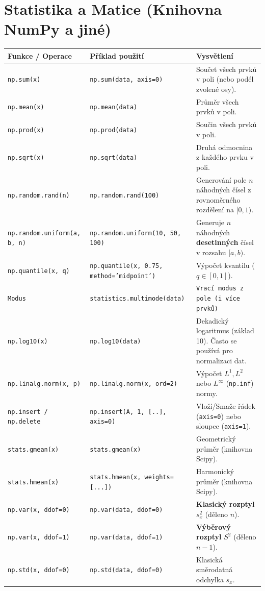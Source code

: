 \documentclass[a4paper, 11pt]{article}
\newenvironment{funkcedict}
{
\renewcommand{\arraystretch}{1.4}
\begin{tabular}{p{0.30\textwidth} p{0.32\textwidth} p{0.33\textwidth}}
\toprule
\textbf{Funkce / Operace} & \textbf{Příklad použití} & \textbf{Vysvětlení} \\
\midrule
}
{
\bottomrule
\end{tabular}
}
\begin{document}
\section{Statistika a Matice (Knihovna NumPy a jiné)}
\begin{funkcedict}
\texttt{np.sum(x)} & \texttt{np.sum(data, axis=0)} & Součet všech prvků v poli (nebo podél zvolené osy). \\
\texttt{np.mean(x)} & \texttt{np.mean(data)} & Průměr všech prvků v poli. \\
\texttt{np.prod(x)} & \texttt{np.prod(data)} & Součin všech prvků v poli. \\
\texttt{np.sqrt(x)} & \texttt{np.sqrt(data)} & Druhá odmocnina z každého prvku v poli. \\
\texttt{np.random.rand(n)} & \texttt{np.random.rand(100)} & Generování pole $n$ náhodných čísel z rovnoměrného rozdělení na $[0, 1)$. \\
\texttt{np.random.uniform(a, b, n)} & \texttt{np.random.uniform(10, 50, 100)} & Generuje $n$ náhodných \textbf{desetinných} čísel v rozsahu $[a, b)$. \\
\texttt{np.quantile(x, q)} & \texttt{np.quantile(x, 0.75, method='midpoint')} & Výpočet kvantilu ($q \in [0, 1]$). \\
\texttt{Modus} & \texttt{statistics.multimode(data)} & \texttt{Vrací modus z pole (i více prvků)} \\
\texttt{np.log10(x)} & \texttt{np.log10(data)} & Dekadický logaritmus (základ 10). Často se používá pro normalizaci dat. \\
\texttt{np.linalg.norm(x, p)} & \texttt{np.linalg.norm(x, ord=2)} & Výpočet $L^1, L^2$ nebo $L^\infty$ (\texttt{np.inf}) normy. \\
\texttt{np.insert / np.delete} & \texttt{np.insert(A, 1, [..], axis=0)} & Vloží/Smaže řádek (\texttt{axis=0}) nebo sloupec 
(\texttt{axis=1}). \\
\texttt{stats.gmean(x)} & \texttt{stats.gmean(x)} & Geometrický průměr (knihovna Scipy). \\
\texttt{stats.hmean(x)} & \texttt{stats.hmean(x, weights=[...])} & Harmonický průměr (knihovna Scipy). \\
\texttt{np.var(x, ddof=0)} & \texttt{np.var(data, ddof=0)} & \textbf{Klasický rozptyl} $s_x^2$ (děleno $n$). \\
\texttt{np.var(x, ddof=1)} & \texttt{np.var(data, ddof=1)} & \textbf{Výběrový rozptyl} $S^2$ (děleno $n-1$). \\
\texttt{np.std(x, ddof=0)} & \texttt{np.std(data, ddof=0)} & Klasická směrodatná odchylka $s_x$. \\

\end{funkcedict}
\end{document}
